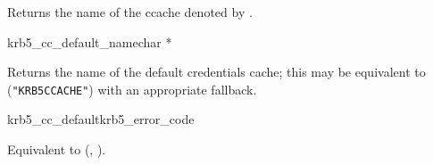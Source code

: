 Returns the name of the ccache denoted by .

\begin{funcdecl}{krb5_cc_default_name}{char *}{\funcvoid}
\end{funcdecl}

Returns the name of the default credentials cache; this may be equivalent to
({\tt "KRB5CCACHE"}) with an appropriate fallback.

\begin{funcdecl}{krb5_cc_default}{krb5_error_code}{\funcout}
\end{funcdecl}

Equivalent to
(,
).

